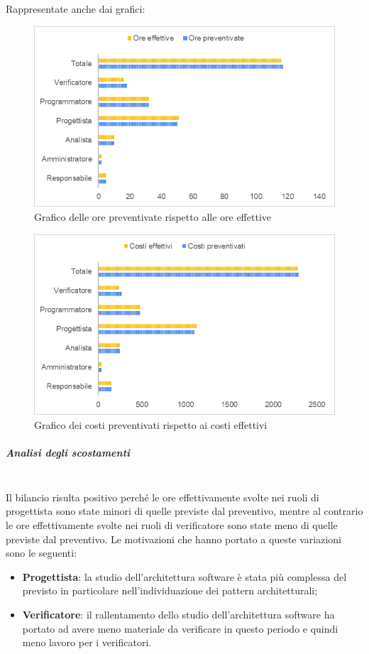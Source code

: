 Rappresentate anche dai grafici:
\begin{figure} [H]
	\includegraphics[width=\linewidth]{./img/Grafici/31.png}
	\caption{Grafico delle ore preventivate rispetto alle ore effettive}
\end{figure}

\begin{figure} [H]
	\includegraphics[width=\linewidth]{./img/Grafici/32.png}
	\caption{Grafico dei costi preventivati rispetto ai costi effettivi}
\end{figure}

\subparagraph*{Analisi degli scostamenti} \mbox{} \\
Il bilancio risulta positivo perché le ore effettivamente svolte nei ruoli di progettista sono state minori di quelle previste dal preventivo, mentre al contrario le ore effettivamente svolte nei ruoli di verificatore sono state meno di quelle previste dal preventivo.
Le motivazioni che hanno portato a queste variazioni sono le seguenti:
\begin{itemize}
	\item \textbf{Progettista}: la studio dell'architettura software è stata più complessa del previsto in particolare nell'individuazione dei pattern architetturali;
	\item \textbf{Verificatore}: il rallentamento dello studio dell'architettura software ha portato ad avere meno materiale da verificare in questo periodo e quindi meno lavoro per i verificatori.
\end{itemize}


